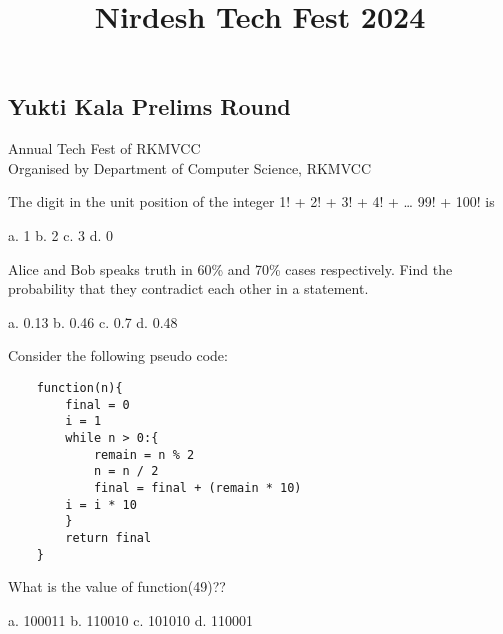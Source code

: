\documentclass[a4paper, addpoints]{exam}
\title{Nirdesh Tech Fest 2024\vspace{-6.5ex}}
\date{}
\begin{document}
\pointformat{}
\maketitle
\begin{center}
\section*{Yukti Kala Prelims Round}
\end{center}
\begin{center}
\begin{large}
Annual Tech Fest of RKMVCC\\
\vspace{2mm}
Organised by Department of Computer Science, RKMVCC
\end{large}
\end{center}
\begin{questions}
	\question The digit in the unit position of the integer 1! + 2! + 3! + 4! + … 99! + 100! is \\
	\begin{oneparcheckboxes}
		\choice a. 1
		\choice b. 2
		\choice c. 3
		\choice d. 0
	\end{oneparcheckboxes}
	\question Alice and Bob speaks truth in 60\% and 70\% cases respectively. Find the probability that they contradict each other in a statement.\\
		\begin{oneparcheckboxes}
		\choice a. 0.13
		\choice b. 0.46
		\choice c. 0.7
		\choice d. 0.48
	\end{oneparcheckboxes}
	\question Consider the following pseudo code:
	\begin{verbatim}
	function(n){
		final = 0
		i = 1
		while n > 0:{
			remain = n % 2
			n = n / 2
			final = final + (remain * 10)
		i = i * 10
		}
		return final
	}
	\end{verbatim}
	What is the value of function(49)??\\
	\begin{oneparcheckboxes}
		\choice a. 100011
		\choice b. 110010
		\choice c. 101010
		\choice d. 110001
	\end{oneparcheckboxes}
\end{questions}
\end{document}
